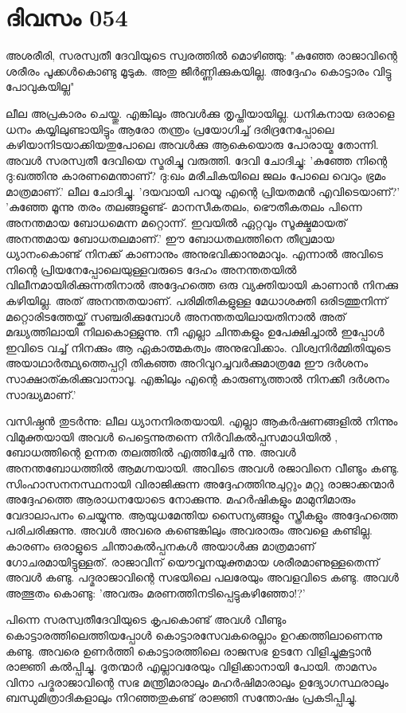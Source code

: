  
\section{ദിവസം 054}


അശരീരി, സരസ്വതീ ദേവിയുടെ സ്വരത്തില്‍ മൊഴിഞ്ഞു: "കുഞ്ഞേ രാജാവിന്റെ ശരീരം പൂക്കള്‍കൊണ്ടു മൂടുക. അതു ജീര്‍ണ്ണിക്കുകയില്ല. അദ്ദേഹം കൊട്ടാരം വിട്ടു പോവുകയില്ല"

ലീല അപ്രകാരം ചെയ്തു. എങ്കിലും അവള്‍ക്കു തൃപ്തിയായില്ല. ധനികനായ ഒരാളെ ധനം കയ്യിലുണ്ടായിട്ടും ആരോ തന്ത്രം പ്രയോഗിച്ച്‌ ദരിദ്രനേപ്പോലെ കഴിയാനിടയാക്കിയതുപോലെ അവള്‍ക്കു ആകെയൊരു പോരായ്മ തോന്നി. അവള്‍ സരസ്വതീ ദേവിയെ സ്മരിച്ചു വരുത്തി. ദേവി ചോദിച്ചു: 'കുഞ്ഞേ നിന്റെ ദു:ഖത്തിനു കാരണമെന്താണ്‌? ദു:ഖം മരീചികയിലെ ജലം പോലെ വെറും ഭ്രമം മാത്രമാണ്‌.'
ലീല ചോദിച്ചു. 'ദയവായി പറയൂ എന്റെ പ്രിയതമന്‍ എവിടെയാണ്‌?'
'കുഞ്ഞേ മൂന്നു തരം തലങ്ങളുണ്ട്‌- മാനസീകതലം, ഭൌതീകതലം പിന്നെ അനന്തമായ ബോധമെന്ന മറ്റൊന്ന്. ഇവയില്‍ ഏറ്റവും സൂക്ഷ്മമായത്‌ അനന്തമായ ബോധതലമാണ്‌.'  ഈ ബോധതലത്തിനെ തീവ്രമായ ധ്യാനംകൊണ്ട്‌ നിനക്ക്‌ കാണാനും അനുഭവിക്കാനുമാവും. എന്നാല്‍ അവിടെ നിന്റെ പ്രിയനേപ്പോലെയുള്ളവരുടെ ദേഹം അനന്തതയില്‍ വിലീനമായിരിക്കുന്നതിനാല്‍ അദ്ദേഹത്തെ ഒരു വ്യക്തിയായി കാണാന്‍ നിനക്കു കഴിയില്ല. അത്‌ അനന്തതയാണ്‌. പരിമിതികളുള്ള മേധാശക്തി ഒരിടത്തുനിന്ന് മറ്റൊരിടത്തേയ്ക്ക്‌ സഞ്ചരിക്കുമ്പോള്‍ അനന്തതയിലായതിനാല്‍ അത്‌ മദ്ധ്യത്തിലായി നിലകൊള്ളുന്നു. നീ എല്ലാ ചിന്തകളും ഉപേക്ഷിച്ചാല്‍ ഇപ്പോള്‍ ഇവിടെ വച്ച്‌ നിനക്കും ആ ഏകാത്മകത്വം അനുഭവിക്കാം. വിശ്വനിര്‍മ്മിതിയുടെ അയാഥാര്‍ത്ഥ്യത്തെപ്പറ്റി തികഞ്ഞ അറിവുറച്ചവര്‍ക്കുമാത്രമേ ഈ ദര്‍ശനം സാക്ഷാത്കരിക്കുവാനാവൂ. എങ്കിലും എന്റെ കാരുണ്യത്താല്‍ നിനക്കീ ദര്‍ശനം സാദ്ധ്യമാണ്‌.'

വസിഷ്ഠന്‍ തുടര്‍ന്നു: ലീല ധ്യാനനിരതയായി. എല്ലാ ആകര്‍ഷണങ്ങളില്‍ നിന്നും വിമുക്തയായി അവള്‍ പെട്ടെന്നുതന്നെ നിര്‍വികല്‍പ്പസമാധിയില്‍ , ബോധത്തിന്റെ ഉന്നത തലത്തില്‍ എത്തിച്ചേര്‍ ന്നു. അവള്‍ അനന്തബോധത്തില്‍ ആമഗ്നയായി. അവിടെ അവള്‍ രജാവിനെ വീണ്ടും കണ്ടു. സിംഹാസനനസ്ഥനായി വിരാജിക്കുന്ന അദ്ദേഹത്തിനുചുറ്റും മറ്റു രാജാക്കന്മാര്‍ അദ്ദേഹത്തെ ആരാധനയോടെ നോക്കുന്നു. മഹര്‍ഷികളും മാമുനിമാരും വേദാലാപനം ചെയ്യുന്നു. ആയുധമേന്തിയ സൈന്യങ്ങളും സ്ത്രീകളും അദ്ദേഹത്തെ പരിചരിക്കുന്നു. അവള്‍ അവരെ കണ്ടെങ്കിലും അവരാരും അവളെ കണ്ടില്ല. കാരണം ഒരാളുടെ ചിന്താകല്‍പ്പനകള്‍ അയാള്‍ക്കു മാത്രമാണ്‌ ഗോചരമായിട്ടുള്ളത്‌. രാജാവിന്‌ യൌവ്വനയുക്തമായ ശരീരമാണുള്ളതെന്ന് അവള്‍ കണ്ടു. പദ്മരാജാവിന്റെ സഭയിലെ പലരേയും അവളവിടെ കണ്ടു. അവള്‍ അത്ഭുതം കൊണ്ടു: 'അവരും മരണത്തിനടിപ്പെട്ടുകഴിഞ്ഞോ!?' 

പിന്നെ സരസ്വതീദേവിയുടെ കൃപകൊണ്ട്‌ അവള്‍ വീണ്ടും കൊട്ടാരത്തിലെത്തിയപ്പോള്‍ കൊട്ടാരസേവകരെല്ലാം ഉറക്കത്തിലാണെന്നു കണ്ടു. അവരെ ഉണര്‍ത്തി കൊട്ടാരത്തിലെ രാജസഭ ഉടനേ വിളിച്ചുകൂട്ടാന്‍ രാജ്ഞി കല്‍പ്പിച്ചു. ദൂതന്മാര്‍ എല്ലാവരേയും വിളിക്കാനായി പോയി. താമസം വിനാ പദ്മരാജാവിന്റെ സഭ മന്ത്രിമാരാലും മഹര്‍ഷിമാരാലും ഉദ്യോഗസ്ഥരാലും ബന്ധുമിത്രാദികളാലും നിറഞ്ഞതുകണ്ട്‌ രാജ്ഞി സന്തോഷം പ്രകടിപ്പിച്ചു.
